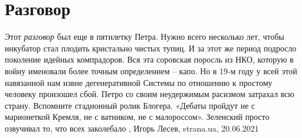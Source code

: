  
 
 
 
 
\chapter{Разговор}
\label{sec:slova.razgovor}

Этот \emph{разговор} был еще в пятилетку Петра. Нужно всего несколько лет,
чтобы инкубатор стал плодить кристально чистых тупиц. И за этот же период
подросло поколение идейных компрадоров. Вся эта соровская поросль из НКО,
которую в войну именовали более точным определением – капо.  Но в 19-м году у
всей этой навязанной нам извне дегенеративной Системы по отношению к простому
человеку произошел сбой. Петро со своим неудержимым расизмом затрахал всю
страну.  Вспомните стадионный ролик Блогера. «Дебаты пройдут не с марионеткой
Кремля, не с ватником, не с малороссом». Зеленский просто озвучивал то, что
всех заколебало
, 
Игорь Лесев, strana.ua, 20.06.2021

